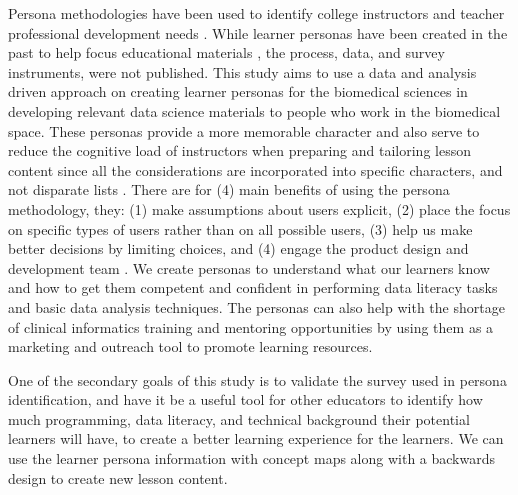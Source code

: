 \documentclass[020-persona\_validation.tex]{subfiles}
\begin{document}
    Persona methodologies have been used to identify
    college instructors and teacher professional development needs
    \cite{zagallo2019through}.
    While learner personas have been created in the past to help focus educational materials
    \cite{rstudioLearnerPersonas2019, softwarecarpentryLearnerProfiles},
    the process, data, and survey instruments, were not published.
    This study aims to use a data and analysis driven approach on creating learner personas for the biomedical sciences
    in developing relevant data science materials to people who
    work in the biomedical space.
    These personas provide a more memorable character and also serve to reduce the cognitive load of instructors
    when preparing and tailoring lesson content since all the considerations are incorporated into specific characters,
    and not disparate lists
    \cite{pruittPersonaLifecycleKeeping2006, schwartzParadoxChoiceWhy2016, cooperInmatesAreRunning1999}.
    There are for (4) main benefits of using the persona methodology, they:
    (1) make assumptions about users explicit,
    (2) place the focus on specific types of users rather than on all possible users,
    (3) help us make better decisions by limiting choices, and
    (4) engage the product design and development team
    \cite{pruittPersonaLifecycleKeeping2006, schwartzParadoxChoiceWhy2016}.
    We create personas to understand what our learners know and how to get them competent and confident
    in performing data literacy tasks and basic data analysis techniques.
    The personas can also help with the shortage of clinical informatics training and mentoring opportunities
    by using them as a marketing and outreach tool to promote learning resources.


    One of the secondary goals of this study is to validate the survey used in persona identification,
    and have it be a useful tool for other educators to identify how much
    programming, data literacy, and technical background their potential learners will have,
    to create a better learning experience for the learners.
    We can use the learner persona information with concept maps along with a backwards design
    to create new lesson content.
\end{document}
